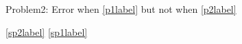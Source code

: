 Problem2: Error when \ref{p1label} but not when \ref{p2label}
\cite{test}

\ref{sp2label}
\ref{sp1label}
\label{sp1label}
